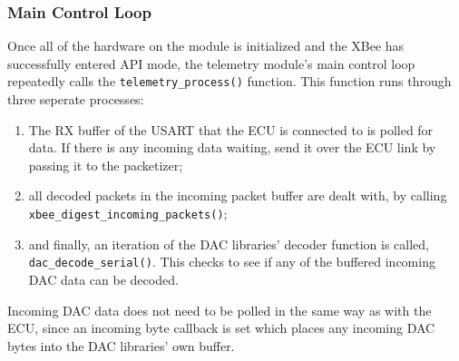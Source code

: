 \subsubsection{Main Control Loop}

Once all of the hardware on the module is initialized and the XBee has successfully entered API mode, the telemetry module's main control loop repeatedly calls the \verb|telemetry_process()| function. This function runs through three seperate processes:
\begin{enumerate}
  \item The RX buffer of the USART that the ECU is connected to is polled for data. If there is any incoming data waiting, send it over the ECU link by passing it to the packetizer;
  \item all decoded packets in the incoming packet buffer are dealt with, by calling\\ \verb|xbee_digest_incoming_packets()|;
  \item and finally, an iteration of the DAC libraries' decoder function is called,\\ \verb|dac_decode_serial()|. This checks to see if any of the buffered incoming DAC data can be decoded.
\end{enumerate}

Incoming DAC data does not need to be polled in the same way as with the ECU, since an incoming byte callback is set which places any incoming DAC bytes into the DAC libraries' own buffer.